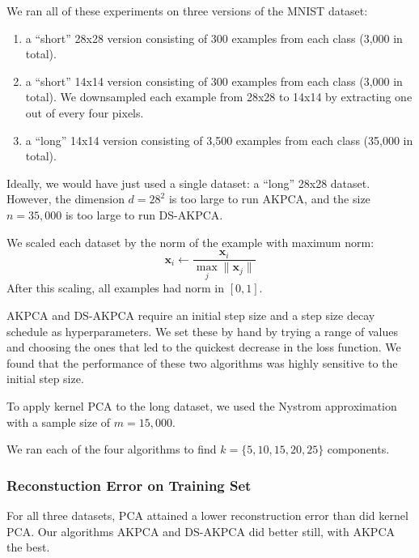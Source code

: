 \documentclass[]{article}
\begin{document}
We ran all of these experiments on three versions of the MNIST dataset:
\begin{enumerate}
\item
a ``short'' 28x28 version consisting of 300 examples from each class (3,000 in total).
\item
a ``short'' 14x14 version consisting of 300 examples from each class (3,000 in total).
We downsampled each example from 28x28 to 14x14 by extracting one out of every four pixels.
\item
a ``long'' 14x14 version consisting of 3,500 examples from each class (35,000 in total).
\end{enumerate}

Ideally, we would have just used a single dataset: a ``long'' 28x28 dataset.
However, the dimension $d = 28^2$ is too large to run AKPCA, and the size $n = 35,000$ is too large to run DS-AKPCA. 

We scaled each dataset by the norm of the example with maximum norm:
$$ \mathbf{x}_i \leftarrow \frac{\mathbf{x}_i}{\max_j \| \mathbf{x}_j \|} $$
After this scaling, all examples had norm in $[0, 1]$.

AKPCA and DS-AKPCA require an initial step size and a step size decay schedule as hyperparameters.
We set these by hand by trying a range of values and choosing the ones that led to the quickest decrease in the loss function.
We found that the performance of these two algorithms was highly sensitive to the initial step size.

To apply kernel PCA to the long dataset, we used the Nystrom approximation with a sample size of $m = 15,000$.

We ran each of the four algorithms to find $k = \{5, 10, 15, 20, 25\}$ components.

\subsubsection{Reconstuction Error on Training Set}

For all three datasets, PCA attained a lower reconstruction error than did kernel PCA.
Our algorithms AKPCA and DS-AKPCA did better still, with AKPCA the best.
\end{document}

